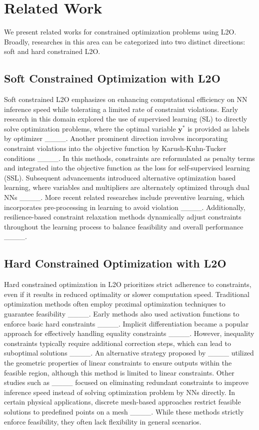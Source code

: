 \section{Related Work}
We present related works for constrained optimization problems using L2O. Broadly, researches in this area can be categorized into two distinct directions: soft and hard constrained L2O. 


\subsection{Soft Constrained Optimization with L2O}
Soft constrained L2O emphasizes on enhancing computational efficiency on NN inference speed while tolerating a limited rate of constraint violations. Early research in this domain explored the use of supervised learning (SL) to directly solve optimization problems, where the optimal variable $\mathbf{y}^*$ is provided as labels by optimizer ____.  Another prominent direction involves incorporating constraint violations into the objective function by Karush-Kuhn-Tucker conditions ____. In this methods, constraints are reformulated as penalty terms and integrated into the objective function as the loss for self-supervised learning (SSL). Subsequent advancements introduced alternative optimization based learning, where variables and multipliers are alternately optimized through dual NNs ____. More recent related researches include preventive learning, which incorporates pre-processing in learning to avoid violation ____. Additionally, resilience-based constraint relaxation methods dynamically adjust constraints throughout the learning process to balance feasibility and overall performance ____.





\subsection{Hard Constrained Optimization with L2O}
Hard constrained optimization in L2O prioritizes strict adherence to constraints, even if it results in reduced optimality or slower computation speed. Traditional optimization methods often employ proximal optimization techniques to guarantee feasibility ____. Early methods also used activation functions to enforce basic hard constraints ____. Implicit differentiation became a popular approach for effectively handling equality constraints ____. However, inequality constraints typically require additional correction steps, which can lead to suboptimal solutions ____. An alternative strategy proposed by ____ utilized the geometric properties of linear constraints to ensure outputs within the feasible region, although this method is limited to linear constraints. Other studies such as ____ focused on eliminating redundant constraints to improve inference speed instead of solving optimization problem by NNs directly. In certain physical applications, discrete mesh-based approaches restrict feasible solutions to predefined points on a mesh ____. While these methods strictly enforce feasibility, they often lack  flexibility in general scenarios.